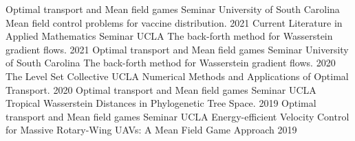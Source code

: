 \begin{cvtalks}
  \cvtalk
    {Optimal transport and Mean field games Seminar} %
    {University of South Carolina}
    {Mean field control problems for vaccine distribution.} %
    {2021} %
  \cvtalk
    {Current Literature in Applied Mathematics Seminar} %
    {UCLA}
    {The back-forth method for Wasserstein gradient flows.} %
    {2021} %
  \cvtalk
    {Optimal transport and Mean field games Seminar} %
    {University of South Carolina}
    {The back-forth method for Wasserstein gradient flows.} %
    {2020} %
  \cvtalk
    {The Level Set Collective} %
    {UCLA}
    {Numerical Methods and Applications of Optimal Transport.} %
    {2020} %
  \cvtalk
    {Optimal transport and Mean field games Seminar} %
    {UCLA}
    {Tropical Wasserstein Distances in Phylogenetic Tree Space.} %
    {2019} %
    \cvtalk
    {Optimal transport and Mean field games Seminar} %
    {UCLA}
    {Energy-efficient Velocity Control for Massive Rotary-Wing UAVs: A Mean Field Game Approach} %
    {2019} %
\end{cvtalks}

